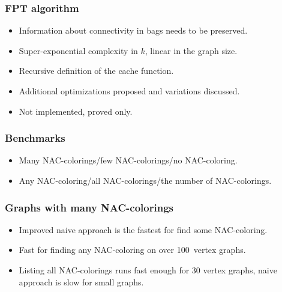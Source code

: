 \documentclass[aspectratio=\myaspectratio]{beamer}
\begin{document}
\begin{frame}
	\frametitle{FPT algorithm}
	\begin{itemize}
		\item
		      Information about connectivity in bags needs to be preserved.
		\item
		      Super-exponential complexity in \( k \), linear in the graph size.
		\item
		      Recursive definition of the cache function.
		\item
		      Additional optimizations proposed and variations discussed.
		\item
		      Not implemented, proved only.
	\end{itemize}
\end{frame}



\begin{frame}
	\frametitle{Benchmarks}
	\begin{itemize}
		\item
		      Many NAC-colorings/few NAC-colorings/no NAC-coloring.
		\item
		      Any NAC-coloring/all NAC-colorings/the number of NAC-colorings.
	\end{itemize}
\end{frame}

\begin{frame}
	\frametitle{Graphs with many NAC-colorings}
	\begin{itemize}
		\item
		      Improved naive approach is the fastest for find some NAC-coloring.
		\item
		      Fast for finding any NAC-coloring on over 100 vertex graphs.
		\item
		      Listing all NAC-colorings runs fast enough for 30 vertex graphs,
		      naive approach is slow for small graphs.
	\end{itemize}
\end{frame}
\end{document}
